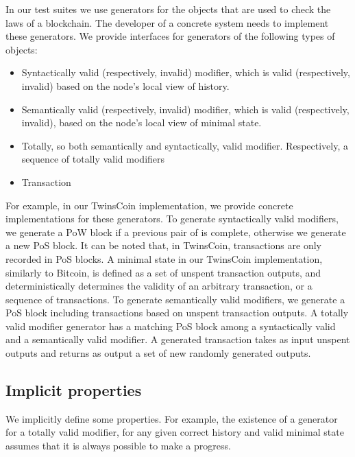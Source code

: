 In our test suites we use generators for the objects that are used to check the laws of a blockchain. The developer of a concrete system needs to implement these generators. We provide interfaces for generators of the following types of objects:

\begin{itemize}
	\item{Syntactically valid (respectively, invalid) modifier, which is valid (respectively, invalid) based on the node's local view of history.}
	\item{Semantically valid (respectively, invalid) modifier, which is valid (respectively, invalid), based on the node's local view of minimal state.}
	\item{Totally, so both semantically and syntactically, valid modifier. Respectively, a sequence of totally valid modifiers}
	\item{Transaction}
\end{itemize}

For example, in our TwinsCoin implementation, we provide concrete implementations for these generators. To generate syntactically valid modifiers, we generate a PoW block if a previous pair of {\em<PoW block, PoS block>} is complete, otherwise we generate a new PoS block. It can be noted that, in TwinsCoin, transactions are only recorded in PoS blocks. A minimal state in our TwinsCoin implementation, similarly to Bitcoin, is defined as a set of unspent transaction outputs, and deterministically determines the validity of an arbitrary transaction, or a sequence of transactions. To generate semantically valid modifiers, we generate a PoS block including transactions based on unspent transaction outputs. A totally valid modifier generator has a matching PoS block among a syntactically valid and a semantically valid modifier. A generated transaction takes as input unspent outputs and returns as output a set of new randomly generated outputs.

\subsection{Implicit properties}

We implicitly define some properties. For example, the existence of a generator for a totally valid modifier, for any given correct history and valid minimal state assumes that it is always possible to make a progress. 


